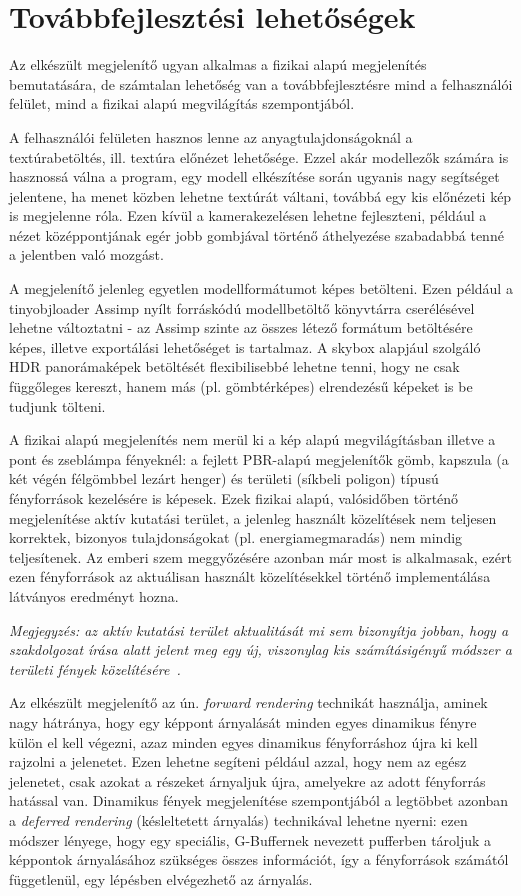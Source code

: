 \section{Továbbfejlesztési lehetőségek}
\label{sec:further_dev}

Az elkészült megjelenítő ugyan alkalmas a fizikai alapú megjelenítés bemutatására, de számtalan lehetőség van a továbbfejlesztésre mind a felhasználói felület, mind a fizikai alapú megvilágítás szempontjából.

A felhasználói felületen hasznos lenne az anyagtulajdonságoknál a textúrabetöltés, ill. textúra előnézet lehetősége. Ezzel akár modellezők számára is hasznossá válna a program, egy modell elkészítése során ugyanis nagy segítséget jelentene, ha menet közben lehetne textúrát váltani, továbbá egy kis előnézeti kép is megjelenne róla. Ezen kívül a kamerakezelésen lehetne fejleszteni, például a nézet középpontjának egér jobb gombjával történő áthelyezése szabadabbá tenné a jelentben való mozgást.

A megjelenítő jelenleg egyetlen modellformátumot képes betölteni. Ezen például a tinyobjloader Assimp nyílt forráskódú modellbetöltő könyvtárra cserélésével lehetne változtatni - az Assimp szinte az összes létező formátum betöltésére képes, illetve exportálási lehetőséget is tartalmaz. A skybox alapjául szolgáló HDR panorámaképek betöltését flexibilisebbé lehetne tenni, hogy ne csak függőleges kereszt, hanem más (pl. gömbtérképes) elrendezésű képeket is be tudjunk tölteni.

A fizikai alapú megjelenítés nem merül ki a kép alapú megvilágításban illetve a pont és zseblámpa fényeknél: a fejlett PBR-alapú megjelenítők gömb, kapszula (a két végén félgömbbel lezárt henger) és területi (síkbeli poligon) típusú fényforrások kezelésére is képesek. Ezek fizikai alapú, valósidőben történő megjelenítése aktív kutatási terület, a jelenleg használt közelítések nem teljesen korrektek, bizonyos tulajdonságokat (pl. energiamegmaradás) nem mindig teljesítenek. Az emberi szem meggyőzésére azonban már most is alkalmasak, ezért ezen fényforrások az aktuálisan használt közelítésekkel történő implementálása látványos eredményt hozna.

\textit{Megjegyzés: az aktív kutatási terület aktualitását mi sem bizonyítja jobban, hogy a szakdolgozat írása alatt jelent meg egy új, viszonylag kis számításigényű módszer a területi fények közelítésére~\cite{real_time_area_light}. }

Az elkészült megjelenítő az ún. \textit{forward rendering} technikát használja, aminek nagy hátránya, hogy egy képpont árnyalását minden egyes dinamikus fényre külön el kell végezni, azaz minden egyes dinamikus fényforráshoz újra ki kell rajzolni a jelenetet. Ezen lehetne segíteni például azzal, hogy nem az egész jelenetet, csak azokat a részeket árnyaljuk újra, amelyekre az adott fényforrás hatással van. Dinamikus fények megjelenítése szempontjából a legtöbbet azonban a \textit{deferred rendering} (késleltetett árnyalás) technikával lehetne nyerni: ezen módszer lényege, hogy egy speciális, G-Buffernek nevezett pufferben tároljuk a képpontok árnyalásához szükséges összes információt, így a fényforrások számától függetlenül, egy lépésben elvégezhető az árnyalás.

